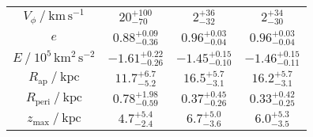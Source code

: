 \begin{table}
\begin{tabular}{cccc}
$V_\phi~/~\mathrm{km\,s^{-1}}$ & $20_{-70}^{+100}$ & $2_{-32}^{+36}$ & $2_{-30}^{+34}$ \\
$e$ & $0.88_{-0.36}^{+0.09}$ & $0.96_{-0.04}^{+0.03}$ & $0.96_{-0.04}^{+0.03}$ \\
$E~/~10^5\,\mathrm{km^{2}\,s^{-2}}$ & $-1.61_{-0.26}^{+0.22}$ & $-1.45_{-0.10}^{+0.15}$ & $-1.46_{-0.11}^{+0.15}$ \\
$R_\text{ap}~/~\mathrm{kpc}$ & $11.7_{-5.2}^{+6.7}$ & $16.5_{-3.1}^{+5.7}$ & $16.2_{-3.1}^{+5.7}$ \\
$R_\text{peri}~/~\mathrm{kpc}$ & $0.78_{-0.59}^{+1.98}$ & $0.37_{-0.26}^{+0.45}$ & $0.33_{-0.25}^{+0.42}$ \\
$z_\text{max}~/~\mathrm{kpc}$ & $4.7_{-2.4}^{+5.4}$ & $6.7_{-3.6}^{+5.0}$ & $6.0_{-3.5}^{+5.3}$ \\
\hline
\end{tabular}
\end{table}
\endgroup
